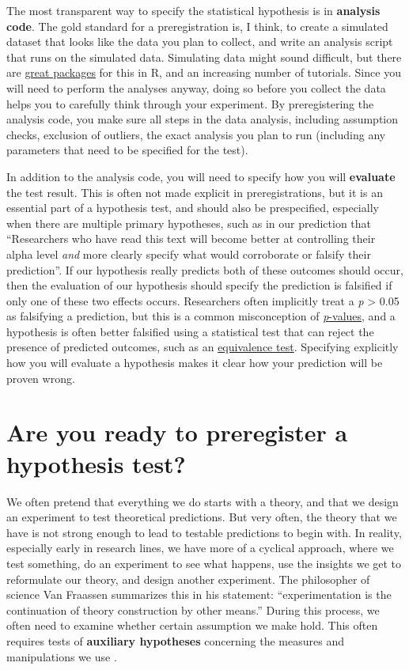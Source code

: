 \documentclass[
  oneside]{book}
\begin{document}
The most transparent way to specify the statistical hypothesis is in \textbf{analysis code}. The gold standard for a preregistration is, I think, to create a simulated dataset that looks like the data you plan to collect, and write an analysis script that runs on the simulated data. Simulating data might sound difficult, but there are \href{https://debruine.github.io/faux/}{great packages} for this in R, and an increasing number of tutorials. Since you will need to perform the analyses anyway, doing so before you collect the data helps you to carefully think through your experiment. By preregistering the analysis code, you make sure all steps in the data analysis, including assumption checks, exclusion of outliers, the exact analysis you plan to run (including any parameters that need to be specified for the test).

In addition to the analysis code, you will need to specify how you will \textbf{evaluate} the test result. This is often not made explicit in preregistrations, but it is an essential part of a hypothesis test, and should also be prespecified, especially when there are multiple primary hypotheses, such as in our prediction that ``Researchers who have read this text will become better at controlling their alpha level \emph{and} more clearly specify what would corroborate or falsify their prediction''. If our hypothesis really predicts both of these outcomes should occur, then the evaluation of our hypothesis should specify the prediction is falsified if only one of these two effects occurs. Researchers often implicitly treat a \emph{p} \textgreater{} 0.05 as falsifying a prediction, but this is a common misconception of \protect\hyperlink{misconception1}{\emph{p}-values}, and a hypothesis is often better falsified using a statistical test that can reject the presence of predicted outcomes, such as an \protect\hyperlink{equivalencetest}{equivalence test}. Specifying explicitly how you will evaluate a hypothesis makes it clear how your prediction will be proven wrong.

\hypertarget{are-you-ready-to-preregister-a-hypothesis-test}{%
\section{Are you ready to preregister a hypothesis test?}\label{are-you-ready-to-preregister-a-hypothesis-test}}

We often pretend that everything we do starts with a theory, and that we design an experiment to test theoretical predictions. But very often, the theory that we have is not strong enough to lead to testable predictions to begin with. In reality, especially early in research lines, we have more of a cyclical approach, where we test something, do an experiment to see what happens, use the insights we get to reformulate our theory, and design another experiment. The philosopher of science Van Fraassen summarizes this in his statement: ``experimentation is the continuation of theory construction by other means.'' During this process, we often need to examine whether certain assumption we make hold. This often requires tests of \textbf{auxiliary hypotheses} concerning the measures and manipulations we use \citep{uygun_tunc_falsificationist_2022}.
\end{document}

